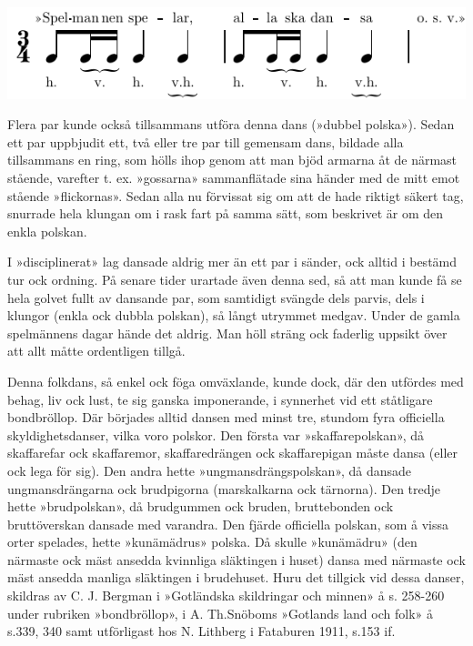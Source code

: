 {\vspace{0.6cm}
\includegraphics{include/snippets/spelmannen-spelar-crop.pdf}
\vspace{0.3cm}

Flera par kunde också tillsammans utföra denna dans (»dubbel polska»). Sedan ett par uppbjudit ett, två eller tre par till gemensam dans, bildade alla tillsammans en ring, som hölls ihop genom att man bjöd armarna åt de närmast stående, varefter t. ex. »gossarna» sammanflätade sina händer med de mitt emot stående »flickornas». Sedan alla nu förvissat sig om att de hade riktigt säkert tag, snurrade hela klungan om i rask fart på samma sätt, som beskrivet är om den enkla polskan.

I »disciplinerat» lag dansade aldrig mer än ett par i sänder, ock alltid i bestämd tur ock ordning. På senare tider urartade även denna sed, så att man kunde få se hela golvet fullt av dansande par, som samtidigt svängde dels parvis, dels i klungor (enkla ock dubbla polskan), så långt utrymmet medgav. Under de gamla spelmännens dagar hände det aldrig. Man höll sträng ock faderlig uppsikt över att allt måtte ordentligen tillgå.

Denna folkdans, så enkel ock föga omväxlande, kunde dock, där den utfördes med behag, liv ock lust, te sig ganska imponerande, i synnerhet vid ett ståtligare bondbröllop. Där börjades alltid dansen med minst tre, stundom fyra officiella skyldighetsdanser, vilka voro polskor. Den första var »skaffarepolskan», då skaffarefar ock skaffaremor, skaffaredrängen ock skaffarepigan måste dansa (eller ock lega för sig). Den andra hette »ungmansdrängspolskan», då dansade ungmansdrängarna ock brudpigorna (marskalkarna ock tärnorna). Den tredje hette »brudpolskan», då brudgummen ock bruden, bruttebonden ock bruttöverskan dansade med varandra. Den fjärde officiella polskan, som å vissa orter spelades, hette »kunämädrus» polska. Då skulle »kunämädru» (den närmaste ock mäst ansedda
kvinnliga släktingen i huset) dansa med närmaste ock mäst ansedda manliga släktingen i brudehuset. Huru det tillgick vid dessa danser, skildras av C. J. Bergman i »Gotländska skildringar och minnen» å s. 258-260 under rubriken »bondbröllop», i A. Th.\@ Snöboms »Gotlands land och folk» å s.\@ 339, 340 samt utförligast hos N. Lithberg i Fataburen 1911, s.\@ 153 if.

}
